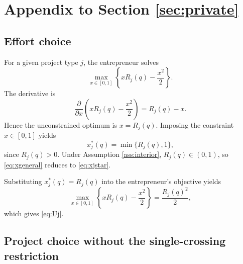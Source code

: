 \section{Appendix to Section \ref{sec:private}}\label{app:privateproofs}

\subsection{Effort choice}\label{app:effort}

For a given project type \(j\), the entrepreneur solves
\begin{equation}
    \max_{x \in [0,1]}
    \left\{
        xR_j(q)-\frac{x^2}{2}
    \right\}.
\end{equation}
The derivative is
\begin{equation}
    \frac{\partial}{\partial x}
    \left(
        xR_j(q)-\frac{x^2}{2}
    \right)
    =
    R_j(q)-x.
\end{equation}
Hence the unconstrained optimum is \(x=R_j(q)\).
Imposing the constraint \(x \in [0,1]\) yields
\begin{equation}\label{eq:xgeneral}
    x_j^*(q)=\min\{R_j(q),1\},
\end{equation}
since \(R_j(q)>0\).
Under Assumption \ref{ass:interior}, \(R_j(q)\in(0,1)\), so \eqref{eq:xgeneral} reduces to \eqref{eq:xjstar}.

Substituting \(x_j^*(q)=R_j(q)\) into the entrepreneur's objective yields
\begin{equation}
    \max_{x \in [0,1]}
    \left\{
        xR_j(q)-\frac{x^2}{2}
    \right\}
    =
    \frac{R_j(q)^2}{2},
\end{equation}
which gives \eqref{eq:Uj}.

\subsection{Project choice without the single-crossing restriction}\label{app:projchoice}

